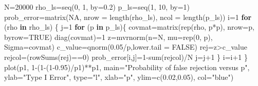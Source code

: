\documentclass[
]{article}
\newenvironment{Shaded}{\begin{snugshade}}{\end{snugshade}}
\newcommand{\AttributeTok}[1]{\textcolor[rgb]{0.77,0.63,0.00}{#1}}
\newcommand{\ConstantTok}[1]{\textcolor[rgb]{0.00,0.00,0.00}{#1}}
\newcommand{\ControlFlowTok}[1]{\textcolor[rgb]{0.13,0.29,0.53}{\textbf{#1}}}
\newcommand{\DecValTok}[1]{\textcolor[rgb]{0.00,0.00,0.81}{#1}}
\newcommand{\FloatTok}[1]{\textcolor[rgb]{0.00,0.00,0.81}{#1}}
\newcommand{\FunctionTok}[1]{\textcolor[rgb]{0.00,0.00,0.00}{#1}}
\newcommand{\NormalTok}[1]{#1}
\newcommand{\OtherTok}[1]{\textcolor[rgb]{0.56,0.35,0.01}{#1}}
\newcommand{\SpecialCharTok}[1]{\textcolor[rgb]{0.00,0.00,0.00}{#1}}
\newcommand{\StringTok}[1]{\textcolor[rgb]{0.31,0.60,0.02}{#1}}
\begin{document}
\begin{Shaded}
\begin{Highlighting}[]
\NormalTok{N}\OtherTok{=}\DecValTok{20000}
\NormalTok{rho\_ls}\OtherTok{=}\FunctionTok{seq}\NormalTok{(}\DecValTok{0}\NormalTok{, }\DecValTok{1}\NormalTok{, }\AttributeTok{by=}\FloatTok{0.2}\NormalTok{)}
\NormalTok{p\_ls}\OtherTok{=}\FunctionTok{seq}\NormalTok{(}\DecValTok{1}\NormalTok{, }\DecValTok{10}\NormalTok{, }\AttributeTok{by=}\DecValTok{1}\NormalTok{)}
\NormalTok{prob\_error}\OtherTok{=}\FunctionTok{matrix}\NormalTok{(}\ConstantTok{NA}\NormalTok{, }\AttributeTok{nrow =} \FunctionTok{length}\NormalTok{(rho\_ls), }\AttributeTok{ncol =} \FunctionTok{length}\NormalTok{(p\_ls))}
\NormalTok{i}\OtherTok{=}\DecValTok{1}
\ControlFlowTok{for}\NormalTok{ (rho }\ControlFlowTok{in}\NormalTok{ rho\_ls) \{}
\NormalTok{  j}\OtherTok{=}\DecValTok{1}
  \ControlFlowTok{for}\NormalTok{ (p }\ControlFlowTok{in}\NormalTok{ p\_ls)\{}
\NormalTok{    covmat}\OtherTok{=}\FunctionTok{matrix}\NormalTok{(}\FunctionTok{rep}\NormalTok{(rho, p}\SpecialCharTok{*}\NormalTok{p), }\AttributeTok{nrow=}\NormalTok{p, }\AttributeTok{byrow=}\ConstantTok{TRUE}\NormalTok{)}
    \FunctionTok{diag}\NormalTok{(covmat)}\OtherTok{=}\DecValTok{1}
\NormalTok{    z}\OtherTok{=}\FunctionTok{mvrnorm}\NormalTok{(}\AttributeTok{n=}\NormalTok{N, }\AttributeTok{mu=}\FunctionTok{rep}\NormalTok{(}\DecValTok{0}\NormalTok{, p), }\AttributeTok{Sigma=}\NormalTok{covmat)}
\NormalTok{    c\_value}\OtherTok{=}\FunctionTok{qnorm}\NormalTok{(}\FloatTok{0.05}\SpecialCharTok{/}\NormalTok{p,}\AttributeTok{lower.tail =} \ConstantTok{FALSE}\NormalTok{)}
\NormalTok{    rej}\OtherTok{=}\NormalTok{z}\SpecialCharTok{\textgreater{}}\NormalTok{c\_value}
\NormalTok{    rejcol}\OtherTok{=}\NormalTok{(}\FunctionTok{rowSums}\NormalTok{(rej)}\SpecialCharTok{==}\DecValTok{0}\NormalTok{)}
\NormalTok{    prob\_error[i,j]}\OtherTok{=}\DecValTok{1}\SpecialCharTok{{-}}\FunctionTok{sum}\NormalTok{(rejcol)}\SpecialCharTok{/}\NormalTok{N}
\NormalTok{    j}\OtherTok{=}\NormalTok{j}\SpecialCharTok{+}\DecValTok{1}
\NormalTok{  \}}
\NormalTok{  i}\OtherTok{=}\NormalTok{i}\SpecialCharTok{+}\DecValTok{1}
\NormalTok{\}}
\FunctionTok{plot}\NormalTok{(p1, }\DecValTok{1}\SpecialCharTok{{-}}\NormalTok{(}\DecValTok{1}\SpecialCharTok{{-}}\NormalTok{(}\DecValTok{1}\FloatTok{{-}0.95}\NormalTok{)}\SpecialCharTok{/}\NormalTok{p1)}\SpecialCharTok{**}\NormalTok{p1, }\AttributeTok{main=}\StringTok{"Probability of false rejection versus p"}\NormalTok{, }\AttributeTok{ylab=}\StringTok{"Type I Error"}\NormalTok{, }\AttributeTok{type=}\StringTok{"l"}\NormalTok{, }\AttributeTok{xlab=}\StringTok{"p"}\NormalTok{, }\AttributeTok{ylim=}\FunctionTok{c}\NormalTok{(}\FloatTok{0.02}\NormalTok{,}\FloatTok{0.05}\NormalTok{), }\AttributeTok{col=}\StringTok{"blue"}\NormalTok{)}

\end{Highlighting}
\end{Shaded}
\end{document}
